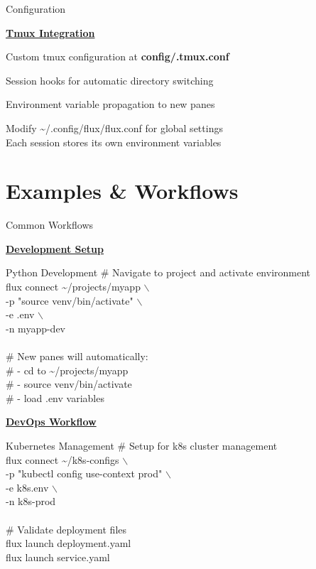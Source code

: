 \documentclass[10pt,a4paper]{article}
\begin{document}
\begin{multicols}{3}
\begin{textbox}{Configuration}

\underline{\textbf{Tmux Integration}}

Custom tmux configuration at \textbf{config/.tmux.conf}

Session hooks for automatic directory switching

Environment variable propagation to new panes


Modify \textasciitilde/.config/flux/flux.conf for global settings\\

Each session stores its own environment variables\\

\end{textbox}

\vfill\null
\columnbreak

\section{Examples \& Workflows}

\begin{textbox}{Common Workflows}

\underline{\textbf{Development Setup}}

\begin{simplecodebox}{Python Development}
\# Navigate to project and activate environment\\
flux connect \textasciitilde/projects/myapp $\backslash$\\
\phantom{xx}-p "source venv/bin/activate" $\backslash$\\
\phantom{xx}-e .env $\backslash$\\
\phantom{xx}-n myapp-dev\\
\\
\# New panes will automatically:\\
\# - cd to \textasciitilde/projects/myapp\\
\# - source venv/bin/activate\\
\# - load .env variables\\
\end{simplecodebox}

\underline{\textbf{DevOps Workflow}}

\begin{simplecodebox}{Kubernetes Management}
\# Setup for k8s cluster management\\
flux connect \textasciitilde/k8s-configs $\backslash$\\
\phantom{xx}-p "kubectl config use-context prod" $\backslash$\\
\phantom{xx}-e k8s.env $\backslash$\\
\phantom{xx}-n k8s-prod\\
\\
\# Validate deployment files\\
flux launch deployment.yaml\\
flux launch service.yaml\\
\end{simplecodebox}


\end{textbox}
\end{multicols}
\end{document}
